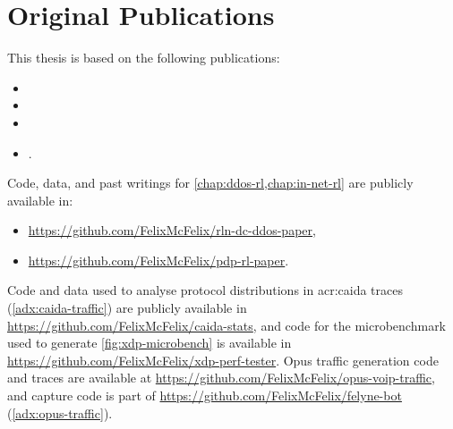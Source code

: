 \chapter*{Original Publications}

This thesis is based on the following publications:
{
\renewcommand*{\mkbibnamefamily}[1]{\textsc{#1}}
\renewcommand*{\mkbibnameprefix}[1]{\textsc{#1}}
\begin{itemize}
	\item {}
	\item {}
	\item {}
	\item {}.
\end{itemize}
}

Code, data, and past writings for \cref{chap:ddos-rl,chap:in-net-rl} are publicly available in:
\begin{itemize}
	\item \url{https://github.com/FelixMcFelix/rln-dc-ddos-paper},
	\item \url{https://github.com/FelixMcFelix/pdp-rl-paper}.
\end{itemize}

Code and data used to analyse protocol distributions in \gls{acr:caida} traces (\cref{adx:caida-traffic}) are publicly available in \url{https://github.com/FelixMcFelix/caida-stats}, and code for the microbenchmark used to generate \cref{fig:xdp-microbench} is available in \url{https://github.com/FelixMcFelix/xdp-perf-tester}.
Opus traffic generation code and traces are available at \url{https://github.com/FelixMcFelix/opus-voip-traffic}, and capture code is part of \url{https://github.com/FelixMcFelix/felyne-bot} (\cref{adx:opus-traffic}).
